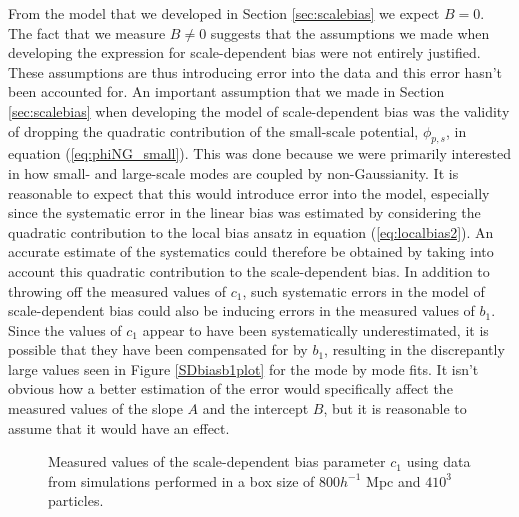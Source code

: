 \documentclass[10pt,letterpaper,final]{iopart}
\numberwithin{equation}{subsection}
\def\ni{\noindent}
\begin{document}
\ni From the model that we developed in Section \ref{sec:scalebias} we expect $B = 0$. The fact that we measure $B  \neq 0$ suggests that the assumptions we made when developing the expression for scale-dependent bias were not entirely justified. These assumptions are thus introducing error into the data and this error hasn't been accounted for. An important assumption that we made in Section \ref{sec:scalebias} when developing the model of scale-dependent bias was the validity of dropping the quadratic contribution of the small-scale potential, $\phi_{p,s}$, in equation (\ref{eq:phiNG_small}). This was done because we were primarily interested in how small- and large-scale modes are coupled by non-Gaussianity. It is reasonable to expect that this would introduce error into the model, especially since the systematic error in the linear bias was estimated by considering the quadratic contribution to the local bias ansatz in equation (\ref{eq:localbias2}). An accurate estimate of the systematics could therefore be obtained by taking into account this quadratic contribution to the scale-dependent bias. In addition to throwing off the measured values of $c_1$, such systematic errors in the model of scale-dependent bias could also be inducing errors in the measured values of $b_1$. Since the values of $c_1$ appear to have been systematically underestimated, it is possible that they have been compensated for by $b_1$, resulting in the discrepantly large values seen in Figure \ref{SDbiasb1plot} for the mode by mode fits. It isn't obvious how a better estimation of the error would specifically affect the measured values of the slope $A$ and the intercept $B$, but it is reasonable to assume that it would have an effect. 



\begin{figure}[!htb]
\begin{center}
\caption{Measured values of the scale-dependent bias parameter $c_1$ using data from simulations performed in a box size of $800 h^{-1}$ Mpc and $410^3$ particles.}
\label{SDbiasc1plot}
\end{center}
\end{figure}
\end{document}
